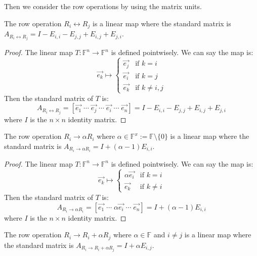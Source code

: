 \documentclass[
	11pt, %
	fleqn, %
	a4paper, %
]{LegrandOrangeBook}
\newcommand{\F}{\mathbb{F}} %
\begin{document}
Then we consider the row operations by using the matrix units.

\begin{proposition}
    The row operation $R_i \leftrightarrow R_j$ is a linear map where the standard matrix is $A_{R_i \leftrightarrow R_j} = I - E_{i,i} - E_{j,j} + E_{i,j} + E_{j,i}$.
\end{proposition}

\begin{proof}
    The linear map $T: \F^n \to \F^n$ is defined pointwisely. We can say the map is:
    \[
        \vec{e_k} \mapsto \begin{cases}
            \vec{e_j} & \text{if } k = i \\
            \vec{e_i} & \text{if } k = j \\
            \vec{e_k} & \text{if } k \neq i, j
        \end{cases}
    \]
    Then the standard matrix of $T$ is:
    \[
        A_{R_i \leftrightarrow R_j} = [\vec{e_1} \; \cdots \; \vec{e_j} \; \cdots \; \vec{e_i} \; \cdots \; \vec{e_n}] = I - E_{i,i} - E_{j,j} + E_{i,j} + E_{j,i}
    \]
    where $I$ is the $n \times n$ identity matrix.
\end{proof}

\begin{proposition}
    The row operation $R_i \to \alpha R_i$ where $\alpha \in \F^x := \F \setminus \{0\}$ is a linear map where the standard matrix is $A_{R_i \to \alpha R_i} = I + (\alpha - 1) E_{i,i}$.
\end{proposition}

\begin{proof}
    The linear map $T: \F^n \to \F^n$ is defined pointwisely. We can say the map is:
    \[
        \vec{e_k} \mapsto \begin{cases}
            \alpha \vec{e_i} & \text{if } k = i \\
            \vec{e_k} & \text{if } k \neq i
        \end{cases}
    \]
    Then the standard matrix of $T$ is:
    \[
        A_{R_i \to \alpha R_i} = [\vec{e_1} \; \cdots \; \alpha\vec{e_i} \; \cdots \; \vec{e_n}] = I + (\alpha - 1) E_{i,i}
    \]
    where $I$ is the $n \times n$ identity matrix.
\end{proof}

\begin{proposition}
    The row operation $R_i \to R_i + \alpha R_j$ where $\alpha \in \F$ and $i \neq j$ is a linear map where the standard matrix is $A_{R_i \to R_i + \alpha R_j} = I + \alpha E_{i,j}$.
\end{proposition}
\end{document}
